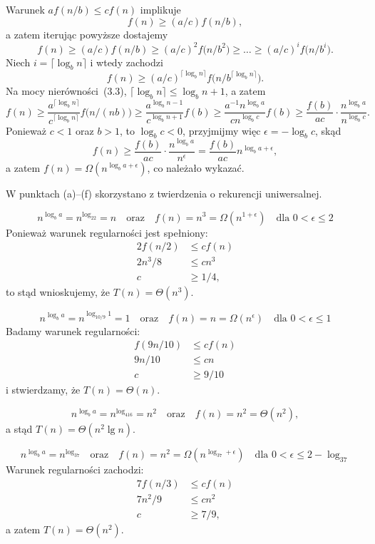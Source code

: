 \exercise{} %
Warunek $af(n/b)\le cf(n)$ implikuje
\[
	f(n) \ge (a/c)f(n/b),
\]
a zatem iterując powyższe dostajemy
\[
	f(n) \ge (a/c)f(n/b) \ge (a/c)^2f\bigl(n/b^2\bigr) \ge \dots \ge (a/c)^if\bigl(n/b^i\bigr).
\]
Niech $i=\lceil\log_bn\rceil$ i wtedy zachodzi
\[
	f(n) \ge (a/c)^{\lceil\log_bn\rceil}f\bigl(n/b^{\lceil\log_bn\rceil}\bigr).
\]
Na mocy nierówności~(3.3), $\lceil\log_bn\rceil\le\log_bn+1$, a zatem
\[
	f(n) \ge \frac{a^{\lceil\log_bn\rceil}}{c^{\lceil\log_bn\rceil}}f\bigl(n/(nb)\bigr) \ge \frac{a^{\log_bn-1}}{c^{\log_bn+1}}f(b) \ge \frac{a^{-1}n^{\log_ba}}{cn^{\log_bc}}f(b) \ge \frac{f(b)}{ac}\cdot\frac{n^{\log_ba}}{n^{\log_bc}}.
\]
Ponieważ $c<1$ oraz $b>1$, to $\log_bc<0$, przyjmijmy więc $\epsilon=-\log_bc$, skąd
\[
	f(n) \ge \frac{f(b)}{ac}\cdot\frac{n^{\log_ba}}{n^\epsilon} = \frac{f(b)}{ac}n^{\log_ba+\epsilon},
\]
a zatem $f(n)=\Omega(n^{\log_ba+\epsilon})$, co należało wykazać.

\problems

W punktach (a)\nobreakdash--(f) skorzystano z twierdzenia o rekurencji uniwersalnej.

\subexercise{} %
\[
	n^{\log_ba} = n^{\log_22} = n \quad\text{oraz}\quad f(n) = n^3 = \Omega(n^{1+\epsilon}) \quad\text{dla $0<\epsilon\le2$}
\]
Ponieważ warunek regularności jest spełniony:
\begin{align*}
	2f(n/2) &\le cf(n) \\
	2n^3\!/8 &\le cn^3 \\
	c &\ge 1/4,
\end{align*}
to stąd wnioskujemy, że $T(n)=\Theta(n^3)$.

\subexercise{} %
\[
	n^{\log_ba} = n^{\log_{10/9}1} = 1 \quad\text{oraz}\quad f(n) = n = \Omega(n^\epsilon) \quad\text{dla $0<\epsilon\le1$}
\]
Badamy warunek regularności:
\begin{align*}
	f(9n/10) &\le cf(n) \\
	9n/10 &\le cn \\
	c &\ge 9/10
\end{align*}
i stwierdzamy, że $T(n)=\Theta(n)$.

\subexercise{} %
\[
	n^{\log_ba} = n^{\log_416} = n^2 \quad\text{oraz}\quad f(n) = n^2 = \Theta(n^2),
\]
a stąd $T(n)=\Theta(n^2\lg n)$.

\subexercise{} %
\[
	n^{\log_ba} = n^{\log_37} \quad\text{oraz}\quad f(n) = n^2 = \Omega(n^{\log_37+\epsilon}) \quad\text{dla $0<\epsilon\le2-\log_37$}
\]
Warunek regularności zachodzi:
\begin{align*}
	7f(n/3) &\le cf(n) \\
	7n^2\!/9 &\le cn^2 \\
	c &\ge 7/9,
\end{align*}
a zatem $T(n)=\Theta(n^2)$.

